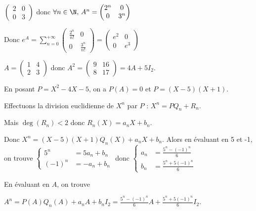 \begin{exemple}
    $\begin{pmatrix}
        2 & 0 \\
        0 & 3
    \end{pmatrix}$ donc $\forall n \in \N, \, A^n = \begin{pmatrix}
        2^n & 0 \\
        0 & 3^n
    \end{pmatrix}$

    Donc $\displaystyle e^A = \sum_{n = 0}^{+\infty} \begin{pmatrix}
        \frac{2^n}{n!} & 0 \\
        0 & \frac{3^n}{n!}
    \end{pmatrix} = \begin{pmatrix}
        e^2 & 0 \\
        0 & e^3
    \end{pmatrix}$

    \lvspace $A = \begin{pmatrix}
        1 & 4 \\
        2 & 3
    \end{pmatrix}$ donc $A^2 = \begin{pmatrix}
        9 & 16 \\
        8 & 17
    \end{pmatrix} = 4A + 5 I_2$. 

    En posant $P = X^2 - 4X - 5$, on a $P(A) = 0$ et $P = (X - 5)(X + 1)$.

    Effectuons la division euclidienne de $X^n$ par $P$ : $X^n = P Q_n + R_n$. 
    
    Mais $\deg(R_n) < 2$ donc $R_n(X) = a_n X + b_n$. 

    Donc $X^n = (X - 5)(X + 1) Q_n(X) + a_n X + b_n$. Alors en évaluant en 5 et -1, on trouve
    $\left\{ \begin{array}{rl}
        5^n & = 5 a_n + b_n \\
        (-1)^n & = -a_n + b_n
    \end{array} \right.$ donc $\left\{ \begin{array}{rl}
        a_n & = \frac{5^n - (-1)^n}{6} \\
        b_n & = \frac{5^{n} + 5(-1)^n}{6}
    \end{array} \right.$

    En évaluant en $A$, on trouve 
    
    $A^n = P(A) Q_n(A) + a_n A + b_n I_2 = \frac{5^n - (-1)^n}{6} A + \frac{5^n + 5(-1)^n}{6} I_2$.


\end{exemple}
